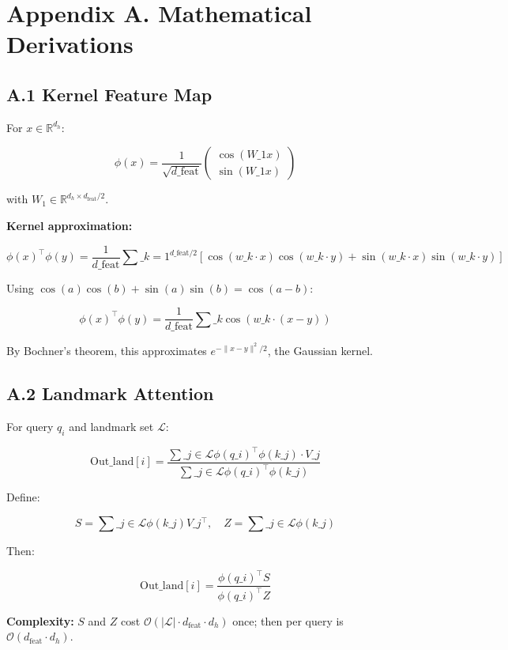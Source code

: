 \section{Appendix A. Mathematical Derivations}

\subsection{A.1 Kernel Feature Map}

For $x \in \mathbb{R}^{d_h}$:

\[
\phi(x) = \frac{1}{\sqrt{d\_\text{feat}}} \begin{pmatrix} \cos(W\_1 x) \\ \sin(W\_1 x) \end{pmatrix}
\tag{A.1}
\]

with $W_1 \in \mathbb{R}^{d_h \times d_\text{feat}/2}$.

\textbf{Kernel approximation:}

\[
\phi(x)^\top \phi(y) = \frac{1}{d\_\text{feat}} \sum\_{k=1}^{d\_\text{feat}/2} [\cos(w\_k \cdot x) \cos(w\_k \cdot y) + \sin(w\_k \cdot x) \sin(w\_k \cdot y)]
\tag{A.2}
\]

Using $\cos(a)\cos(b) + \sin(a)\sin(b) = \cos(a - b)$:

\[
\phi(x)^\top \phi(y) = \frac{1}{d\_\text{feat}} \sum\_k \cos(w\_k \cdot (x - y))
\tag{A.3}
\]

By Bochner's theorem, this approximates $e^{-\|x-y\|^2/2}$, the Gaussian kernel.

\subsection{A.2 Landmark Attention}

For query $q_i$ and landmark set $\mathcal{L}$:

\[
\text{Out}\_\text{land}[i] = \frac{\sum\_{j \in \mathcal{L}} \phi(q\_i)^\top \phi(k\_j) \cdot V\_j}{\sum\_{j \in \mathcal{L}} \phi(q\_i)^\top \phi(k\_j)}
\tag{A.4}
\]

Define:

\[
S = \sum\_{j \in \mathcal{L}} \phi(k\_j) V\_j^\top, \quad Z = \sum\_{j \in \mathcal{L}} \phi(k\_j)
\tag{A.5}
\]

Then:

\[
\text{Out}\_\text{land}[i] = \frac{\phi(q\_i)^\top S}{\phi(q\_i)^\top Z}
\tag{A.6}
\]

\textbf{Complexity:} $S$ and $Z$ cost $\mathcal{O}(|\mathcal{L}| \cdot d_\text{feat} \cdot d_h)$ 
once; then per query is $\mathcal{O}(d_\text{feat} \cdot d_h)$.

